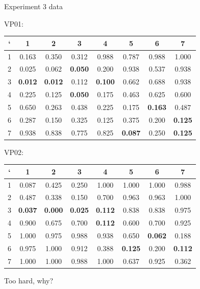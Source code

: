 \documentclass{beamer}
\begin{document}
\begin{frame}[t]{Experiment 3 data}

VP01:
\begin{tabular}{c | c c c c c c c}
` & 1 & 2 & 3 & 4 & 5 & 6 & 7 \\ \hline

1 & {\color{red} 0.163} & 0.350 & 0.312 & 0.988 & 0.787 & 0.988 & 1.000\\

2 & {\color{red} 0.025} & 0.062 &{\bf 0.050}& 0.200 & 0.938 & 0.537 & 0.938\\

3 & {\bf \color{red} 0.012} & {\bf \color{red} 0.012} & 0.112 & {\bf 0.100} & 0.662 & 0.688 & 0.938\\

4 & 0.225 & 0.125 & {\bf \color{red} 0.050} & 0.175 & 0.463 & 0.625 & 0.600\\

5 & 0.650 & 0.263 & 0.438 & 0.225 & 0.175 & {\bf \color{red} 0.163} & 0.487\\

6 & 0.287 & 0.150 & 0.325 & {\color{red} 0.125} & 0.375 & 0.200 & {\bf \color{red} 0.125}\\

7 & 0.938 & 0.838 & 0.775 & 0.825 & {\bf \color{red} 0.087} & 0.250 & {\bf 0.125}\\

\end{tabular}

VP02:
\begin{tabular}{c | c c c c c c c}
` & 1 & 2 & 3 & 4 & 5 & 6 & 7 \\ \hline

1 & {\color{red} 0.087} & 0.425 & 0.250 & 1.000 & 1.000 & 1.000 & 0.988\\

2 & 0.487 & 0.338 & {\color{red} 0.150} & 0.700 & 0.963 & 0.963 & 1.000\\

3 & {\bf 0.037} & {\bf \color{red} 0.000} & {\bf 0.025} & {\bf 0.112} & 0.838 & 0.838 & 0.975\\

4 & 0.900 & 0.675 & 0.700 & {\bf \color{red} 0.112} & 0.600 & 0.700 & 0.925\\

5 & 1.000 & 0.975 & 0.988 & 0.938 & 0.650 & {\bf \color{red} 0.062} & 0.188\\

6 & 0.975 & 1.000 & 0.912 & 0.388 & {\bf 0.125} & 0.200 & {\bf \color{red} 0.112}\\

7 & 1.000 & 1.000 & 0.988 & 1.000 & 0.637 & 0.925 & {\color{red} 0.362}\\

\end{tabular}

Too hard, why?

\end{frame}
\end{document}
